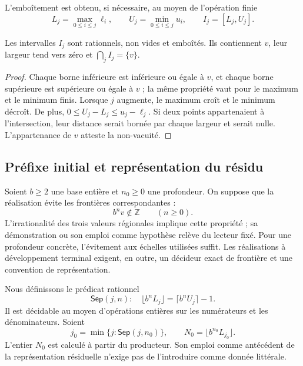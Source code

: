 L'emboîtement est obtenu, si nécessaire, au moyen de l'opération finie
\begin{equation}
 L_j=\max_{0\leq i\leq j}\ell_i,
 \qquad U_j=\min_{0\leq i\leq j}u_i,
 \qquad I_j=[L_j,U_j].
 \label{eq:residual-anidacion}
\end{equation}

\begin{proposition}
\label{prop:residual-anidacion}
Les intervalles \(I_j\) sont rationnels, non vides et emboîtés. Ils contiennent
\(v\), leur largeur tend vers zéro et \(\bigcap_j I_j=\{v\}\).
\end{proposition}
\begin{proof}
Chaque borne inférieure est inférieure ou égale à \(v\), et chaque borne supérieure est
supérieure ou égale à \(v\) ; la même propriété vaut pour le maximum et le minimum
finis. Lorsque \(j\) augmente, le maximum croît et le minimum décroît.
De plus, \(0\leq U_j-L_j\leq u_j-\ell_j\). Si deux points appartenaient à
l'intersection, leur distance serait bornée par chaque largeur et serait nulle.
L'appartenance de \(v\) atteste la non-vacuité.
\end{proof}

\subsection{Préfixe initial et représentation du résidu}
\label{subsec:residual-inicializacion}

Soient \(b\geq2\) une base entière et \(n_0\geq0\) une profondeur.
On suppose que la réalisation évite les frontières correspondantes :
\begin{equation}
 b^n v\notin\mathbb Z\qquad(n\geq0).
 \label{eq:residual-no-frontera}
\end{equation}
L'irrationalité des trois valeurs régionales implique cette propriété ;
sa démonstration ou son emploi comme hypothèse relève du lecteur fixé.
Pour une profondeur concrète, l'évitement aux échelles utilisées
suffit. Les réalisations à développement terminal exigent, en outre,
un décideur exact de frontière et une convention de représentation.

Nous définissons le prédicat rationnel
\[
 \mathsf{Sep}(j,n):\quad
 \lfloor b^n L_j\rfloor=\lceil b^n U_j\rceil-1.
\]
Il est décidable au moyen d'opérations entières sur les numérateurs et les
dénominateurs. Soient
\begin{equation}
 j_0=\min\{j:\mathsf{Sep}(j,n_0)\},
 \qquad N_0=\lfloor b^{n_0}L_{j_0}\rfloor.
 \label{eq:residual-prefijo-inicial}
\end{equation}
L'entier \(N_0\) est calculé à partir du producteur. Son emploi comme antécédent
de la représentation résiduelle n'exige pas de l'introduire comme donnée littérale.

